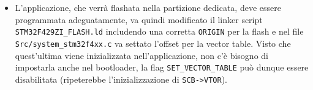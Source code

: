 \begin{itemize}
  \item L'applicazione, che verr\`a flashata nella partizione dedicata, deve essere programmata adeguatamente, va quindi modificato il linker script \texttt{STM32F429ZI\_FLASH.ld} includendo una corretta \texttt{ORIGIN} per la flash e nel file \texttt{Src/system\_stm32f4xx.c} va settato l'offset per la vector table. Visto che quest'ultima viene inizializzata nell'applicazione, non c'\`e bisogno di impostarla anche nel bootloader, la flag \texttt{SET\_VECTOR\_TABLE} pu\`o dunque essere disabilitata (ripeterebbe l'inizializzazione di \texttt{SCB->VTOR}).
\end{itemize}
